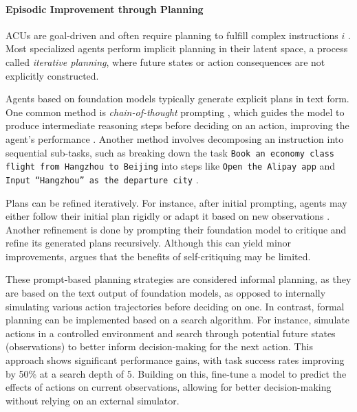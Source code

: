 \paragraph{Episodic Improvement through Planning} \label{sec:episodic_planning}

ACUs are goal-driven and often require planning to fulfill complex instructions $i$ \citep[Chapter~2.4]{russell_artificial_2022}. Most specialized agents perform implicit planning in their latent space, a process \citet{li_zero-shot_2023} called \emph{iterative planning}, where future states or action consequences are not explicitly constructed.

Agents based on foundation models typically generate explicit plans in text form. One common method is \emph{chain-of-thought} prompting \citep{liu_chain_2023}, which guides the model to produce intermediate reasoning steps before deciding on an action, improving the agent's performance . Another method involves decomposing an instruction into sequential sub-tasks, such as breaking down the task \texttt{Book an economy class flight from Hangzhou to Beijing} into steps like \texttt{Open the Alipay app} and \texttt{Input ``Hangzhou'' as the departure city} \citep{guan_intelligent_2023}. 

Plans can be refined iteratively.
For instance, after initial prompting, agents may either follow their initial plan rigidly  or adapt it based on new observations .
Another refinement \citep{kim_language_2023} is done by prompting their foundation model to critique and refine its generated plans recursively. Although this can yield minor improvements, \citep{kambhampati_can_2024} argues that the benefits of self-critiquing may be limited.

These prompt-based planning strategies are considered informal planning, as they are based on the text output of foundation models, as opposed to internally simulating various action trajectories before deciding on one.
In contrast, formal planning can be implemented based on a search algorithm.
For instance, \citet{koh_tree_2024} simulate actions in a controlled environment and search through potential future states (observations) to better inform decision-making for the next action.
This approach shows significant performance gains, with task success rates improving by 50\% at a search depth of $5$. 
Building on this, \citet{chae_web_2024} fine-tune a model to predict the effects of actions on current observations, allowing for better decision-making without relying on an external simulator.



